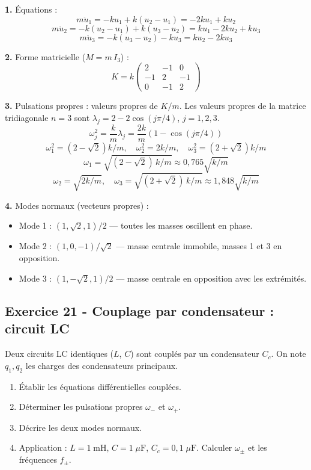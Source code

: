 \documentclass[12pt,a4paper]{article}
\begin{document}
\begin{boitecorrige}
\textbf{1.} Équations :
\[
m\ddot{u}_1 = -k u_1 + k(u_2 - u_1) = -2ku_1 + ku_2
\]
\[
m\ddot{u}_2 = -k(u_2-u_1) + k(u_3-u_2) = ku_1 - 2ku_2 + ku_3
\]
\[
m\ddot{u}_3 = -k(u_3-u_2) - ku_3 = ku_2 - 2ku_3
\]

\textbf{2.} Forme matricielle ($M = m\,I_3$) :
\[
K = k\begin{pmatrix} 2 & -1 & 0 \\ -1 & 2 & -1 \\ 0 & -1 & 2 \end{pmatrix}
\]

\textbf{3.} Pulsations propres : valeurs propres de $K/m$. Les valeurs propres de la matrice tridiagonale $n=3$ sont $\lambda_j = 2 - 2\cos(j\pi/4)$, $j=1,2,3$.
\[
\omega_j^2 = \frac{k}{m}\lambda_j = \frac{2k}{m}(1-\cos(j\pi/4))
\]
\[
\omega_1^2 = (2-\sqrt{2})k/m, \quad \omega_2^2 = 2k/m, \quad \omega_3^2 = (2+\sqrt{2})k/m
\]
\[
\omega_1 = \sqrt{(2-\sqrt{2})\,k/m} \approx 0{,}765\sqrt{k/m}
\]
\[
\omega_2 = \sqrt{2k/m}, \quad \omega_3 = \sqrt{(2+\sqrt{2})\,k/m} \approx 1{,}848\sqrt{k/m}
\]

\textbf{4.} Modes normaux (vecteurs propres) :
\begin{itemize}[nosep]
  \item Mode 1 : $(1, \sqrt{2}, 1)/2$ --- toutes les masses oscillent en phase.
  \item Mode 2 : $(1, 0, -1)/\sqrt{2}$ --- masse centrale immobile, masses 1 et 3 en opposition.
  \item Mode 3 : $(1, -\sqrt{2}, 1)/2$ --- masse centrale en opposition avec les extrémités.
\end{itemize}
\end{boitecorrige}

\newpage
\subsection*{Exercice 21 - Couplage par condensateur : circuit LC \niveau{\difficile}}

\begin{boiteexercice}
Deux circuits LC identiques ($L$, $C$) sont couplés par un condensateur $C_c$. On note $q_1, q_2$ les charges des condensateurs principaux.
\begin{enumerate}
  \item Établir les équations différentielles couplées.
  \item Déterminer les pulsations propres $\omega_-$ et $\omega_+$.
  \item Décrire les deux modes normaux.
  \item Application : $L = 1\;\text{mH}$, $C = 1\;\mu\text{F}$, $C_c = 0{,}1\;\mu\text{F}$. Calculer $\omega_\pm$ et les fréquences $f_\pm$.
\end{enumerate}
\end{boiteexercice}
\end{document}
